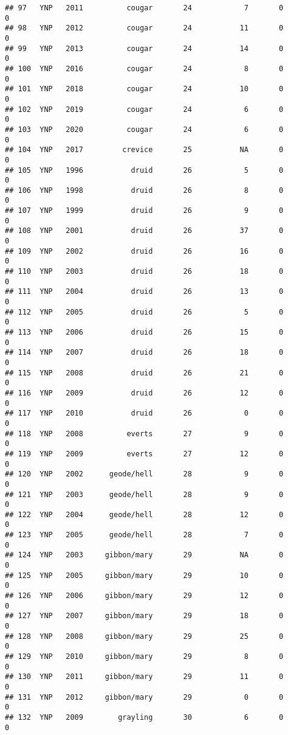 \documentclass[
]{article}
\begin{document}
\begin{verbatim}
## 97   YNP   2011          cougar       24            7       0        0
## 98   YNP   2012          cougar       24           11       0        0
## 99   YNP   2013          cougar       24           14       0        0
## 100  YNP   2016          cougar       24            8       0        0
## 101  YNP   2018          cougar       24           10       0        0
## 102  YNP   2019          cougar       24            6       0        0
## 103  YNP   2020          cougar       24            6       0        0
## 104  YNP   2017         crevice       25           NA       0        0
## 105  YNP   1996           druid       26            5       0        0
## 106  YNP   1998           druid       26            8       0        0
## 107  YNP   1999           druid       26            9       0        0
## 108  YNP   2001           druid       26           37       0        0
## 109  YNP   2002           druid       26           16       0        0
## 110  YNP   2003           druid       26           18       0        0
## 111  YNP   2004           druid       26           13       0        0
## 112  YNP   2005           druid       26            5       0        0
## 113  YNP   2006           druid       26           15       0        0
## 114  YNP   2007           druid       26           18       0        0
## 115  YNP   2008           druid       26           21       0        0
## 116  YNP   2009           druid       26           12       0        0
## 117  YNP   2010           druid       26            0       0        0
## 118  YNP   2008          everts       27            9       0        0
## 119  YNP   2009          everts       27           12       0        0
## 120  YNP   2002      geode/hell       28            9       0        0
## 121  YNP   2003      geode/hell       28            9       0        0
## 122  YNP   2004      geode/hell       28           12       0        0
## 123  YNP   2005      geode/hell       28            7       0        0
## 124  YNP   2003     gibbon/mary       29           NA       0        0
## 125  YNP   2005     gibbon/mary       29           10       0        0
## 126  YNP   2006     gibbon/mary       29           12       0        0
## 127  YNP   2007     gibbon/mary       29           18       0        0
## 128  YNP   2008     gibbon/mary       29           25       0        0
## 129  YNP   2010     gibbon/mary       29            8       0        0
## 130  YNP   2011     gibbon/mary       29           11       0        0
## 131  YNP   2012     gibbon/mary       29            0       0        0
## 132  YNP   2009        grayling       30            6       0        0

\end{verbatim}
\end{document}
